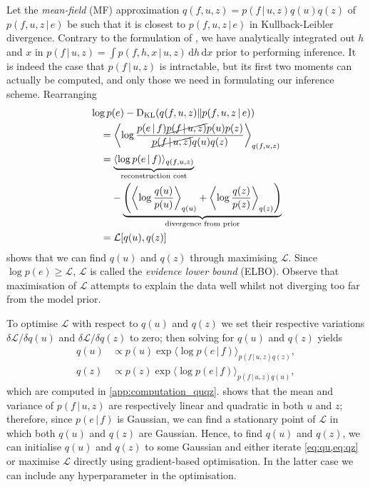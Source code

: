 \documentclass{article}
\newcommand{\KL}{\operatorname{D}_{\text{KL}}}
\newcommand{\id}[1]{\, \mathrm{d} #1}     %
\newcommand{\cond}{\, | \,}               %
\renewcommand{\ll}{\left}
\newcommand{\rr}{\right}
\newcommand{\la}{\langle}
\newcommand{\ra}{\rangle}
\newcommand{\phan}[1]{\hphantom{#1\;}}
\begin{document}
Let the \textit{mean-field} (MF) approximation $q(f,u,z)=p(f\cond u, z)q(u)q(z)$ of $p(f,u,z\cond e)$ be such that it is closest to $p(f,u,z\cond e)$ in Kullback-Leibler divergence. Contrary to the formulation of \citet{Tobar:2015:Learning_Stationary}, we have analytically integrated out $h$ and $x$ in $p(f\cond u, z)=\int p(f, h, x\cond u, z)\id{h}\id{x}$ prior to performing inference. It is indeed the case that $p(f\cond u, z)$ is intractable, but its first two moments can actually be computed, and only those we need in formulating our inference scheme. Rearranging
\begin{align*}
    &\log p(e) - \KL(q(f,u,z)\|p(f,u,z\cond e)) \\
    &\quad= \ll\la \log \frac{p(e\cond f)\cancel{p(f\cond u, z)}p(u)p(z)}{\cancel{p(f\cond u, z)}q(u)q(z)} \rr\ra_{q(f,u,z)} \\
    &\quad= \underbrace{\la \log p(e\cond f) \ra_{q(f,u,z)}}_{\text{reconstruction cost}} \\
    &\quad\phan{=}- \underbrace{\ll(\ll\la\log\frac{q(u)}{p(u)}\rr\ra_{q(u)} + \ll\la\log\frac{q(z)}{p(z)}\rr\ra_{q(z)}\rr)}_{\text{divergence from prior}} \\
    &\quad=\mathcal{L}[q(u),q(z)]
\end{align*}
shows that we can find $q(u)$ and $q(z)$ through maximising $\mathcal{L}$. Since $\log p(e)\ge\mathcal{L}$, $\mathcal{L}$ is called the \textit{evidence lower bound} (ELBO). Observe that maximisation of $\mathcal{L}$ attempts to explain the data well whilst not diverging too far from the model prior.

To optimise $\mathcal{L}$ with respect to $q(u)$ and $q(z)$ we set their respective variations $\delta \mathcal{L} / \delta q(u)$ and $\delta \mathcal{L} / \delta q(z)$ to zero; then solving for $q(u)$ and $q(z)$ yields
\begin{align}
    q(u) &\propto p(u) \exp \la \log p(e\cond f) \ra_{p(f\cond u,z)q(z)}, \label{eq:qu} \\
    q(z) &\propto p(z) \exp \la \log p(e\cond f) \ra_{p(f\cond u,z)q(u)}, \label{eq:qz}
\end{align}
which are computed in \cref{app:computation_quqz}.
 shows that the mean and variance of $p(f\cond u, z)$ are respectively linear and quadratic in both $u$ and $z$; therefore, since $p(e\cond f)$ is Gaussian, we can find a stationary point of $\mathcal{L}$ in which both $q(u)$ and $q(z)$ are Gaussian. Hence, to find $q(u)$ and $q(z)$, we can initialise $q(u)$ and $q(z)$ to some Gaussian and either iterate \cref{eq:qu,eq:qz} or maximise $\mathcal{L}$ directly using gradient-based optimisation. In the latter case we can include any hyperparameter in the optimisation.
\end{document}
